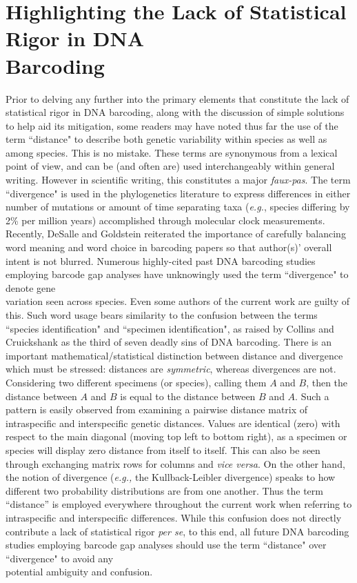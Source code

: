 \section{Highlighting the Lack of Statistical Rigor in DNA \\ Barcoding}

Prior to delving any further into the primary elements that constitute the lack of \\ statistical rigor in DNA barcoding, along with the discussion of simple solutions to help aid its mitigation, some readers may have noted thus far the use of the term ``distance" to describe both genetic variability within species as well as among species. This is no mistake. These terms are synonymous from a lexical point of view, and can be (and often are) used interchangeably within general writing. However in scientific writing, this constitutes a major \textit{faux-pas}. The term ``divergence" is used in the phylogenetics literature to express differences in either number of mutations or amount of time separating taxa (\textit{e.g.}, species differing by 2\% per million years) accomplished through molecular clock measurements. Recently, DeSalle and Goldstein \cite{desalle2019review} reiterated the importance of carefully balancing word meaning and word choice in barcoding papers so that author(s)' overall intent is not blurred. Numerous highly-cited past DNA barcoding studies employing barcode gap analyses have unknowingly used the term ``divergence" to denote gene \\ variation seen across species. Even some authors of the current work are guilty of this. Such word usage bears similarity to the confusion between the terms ``species identification" and ``specimen identification", as raised by Collins and Cruickshank \cite{collins2013seven} as the third of seven deadly sins of DNA barcoding. There is an important mathematical/statistical distinction between distance and divergence which must be stressed: distances are \textit{symmetric}, whereas divergences are not. Considering two different specimens (or species), calling them $A$ and $B$, then the distance between $A$ and $B$ is equal to the distance between $B$ and $A$. Such a pattern is easily observed from examining a pairwise distance matrix of intraspecific and interspecific genetic distances. Values are identical (zero) with respect to the main diagonal (moving top left to bottom right), as a specimen or species will display zero distance from itself to itself. This can also be seen through exchanging matrix rows for columns and \textit{vice versa}. On the other hand, the notion of divergence (\textit{e.g.,} the Kullback-Leibler divergence) speaks to how different two probability distributions are from one another. Thus the term ``distance'' is employed everywhere throughout the current work when referring to intraspecific and interspecific differences. While this confusion does not directly contribute a lack of statistical rigor \textit{per se}, to this end, all future DNA barcoding studies employing barcode gap analyses should use the term ``distance" over ``divergence" to avoid any \\ potential ambiguity and confusion.  



